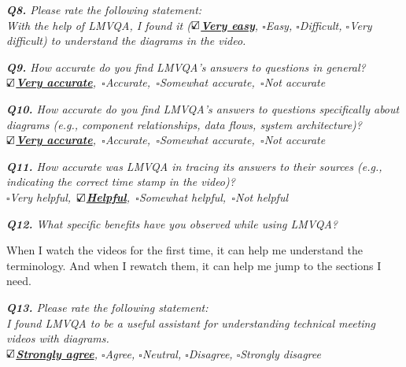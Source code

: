 \vspace*{1em}\noindent\textit{\textbf{Q8.} Please rate the following statement:
\\[.5em]
 \textit{With the help of LMVQA, I found it}
(\underline{\bfseries$\text{\rlap{$\checkmark$}}\square$Very easy}, $\square$Easy, $\square$Difficult, $\square$Very difficult)
to understand the diagrams in the video.
}


\vspace*{1em}\noindent\textit{\textbf{Q9.} How accurate do you find LMVQA's answers to questions in general?
\\[.5em]
        \indent\underline{\bfseries$\text{\rlap{$\checkmark$}}\square$Very accurate},\,
        $\square$Accurate,\,
        $\square$Somewhat accurate,\,
        $\square$Not accurate
}



\vspace*{1em}\noindent\textit{\textbf{Q10.} How accurate do you find LMVQA's answers to questions specifically about diagrams (e.g., component relationships, data flows, system architecture)?
\\[.5em]
        \indent \underline{\bfseries$\text{\rlap{$\checkmark$}}\square$Very accurate},\,
        $\square$Accurate,\,
        $\square$Somewhat accurate,\,
        $\square$Not accurate
}



\vspace*{1em}\noindent\textit{\textbf{Q11.} 
How accurate was LMVQA in tracing its answers to their sources
(e.g.,  indicating the correct time stamp in the video)?
\\[.5em]
\indent $\square$Very helpful,\,
\underline{\bfseries$\text{\rlap{$\checkmark$}}\square$Helpful},\,
$\square$Somewhat helpful,\,
$\square$Not helpful
}


\vspace*{1em}\noindent\textit{\textbf{Q12.} What specific benefits have you observed while using LMVQA?
}
\begin{samepage}
\begin{mdframed}[style=MyFrame]
When I watch the videos for the first time, it can help me understand the terminology. And when I rewatch them, it can help me jump to the sections I need.
\end{mdframed}
\end{samepage}

\vspace*{1em}\noindent\textit{\textbf{Q13.} Please rate the following statement:
\\[.5em]
\textit{I found LMVQA to be a useful assistant for understanding technical meeting videos with diagrams.}
\\[.5em]
\indent \underline{\bfseries$\text{\rlap{$\checkmark$}}\square$Strongly agree},
$\square$Agree,
$\square$Neutral,
$\square$Disagree,
$\square$Strongly disagree
}

